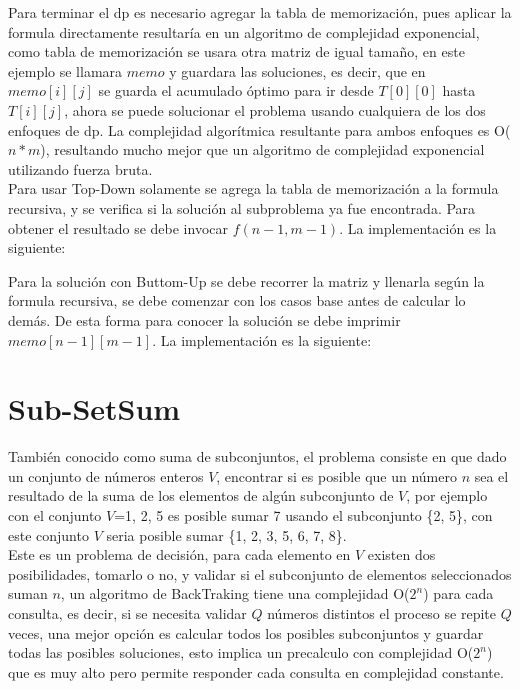 \documentclass[12pt, a4paper]{article}
\newcommand\cppfile[2][]{

}
\begin{document}
\begin{figure}[!htb]
			\caption{}
			\label{dp:introduccion:matriz3}
		\endminipage
	\end{figure}
	
	Para terminar el dp es necesario agregar la tabla de memorización, pues aplicar la formula directamente resultaría 
	en un algoritmo de complejidad exponencial, como tabla de memorización se usara otra matriz de igual tamaño, en  
	este ejemplo se llamara $memo$ y guardara las soluciones, es decir, que en $memo[i][j]$ se guarda el acumulado 
	óptimo para ir desde $T[0][0]$ hasta $T[i][j]$, ahora se puede solucionar el problema usando cualquiera de los dos 
	enfoques de dp. La complejidad algorítmica resultante para ambos enfoques es O($n*m$), resultando mucho mejor que 
	un algoritmo de complejidad exponencial utilizando fuerza bruta.\\
	
	Para usar Top-Down solamente se agrega la tabla de memorización a la formula recursiva, y se verifica si la 
	solución al subproblema ya fue encontrada. Para obtener el resultado se debe invocar $f(n-1, m-1)$. La 
	implementación es la siguiente:
	\cppfile[9-17]{Programacion_dinamica/codigos/matriz.cpp}
	
	Para la solución con Buttom-Up se debe recorrer la matriz y llenarla según la formula recursiva, se debe comenzar  
	con los casos base antes de calcular lo demás. De esta forma para conocer la solución se debe imprimir 
	$memo[n-1][m-1]$. La implementación es la siguiente:
	\cppfile[19-31]{Programacion_dinamica/codigos/matriz.cpp}
		
	\section{Sub-SetSum}
	\label{dp:sub_set_sum}
	
	También conocido como suma de subconjuntos, el problema consiste en que dado un conjunto de números enteros
	$V$, encontrar si es posible que un número $n$ sea el resultado de la suma de los elementos de algún
	subconjunto de $V$, por ejemplo con el conjunto $V$={1, 2, 5} es posible sumar 7 usando el subconjunto \{2, 5\},
	con este conjunto $V$ seria posible sumar \{1, 2, 3, 5, 6, 7, 8\}.\\
	
	Este es un problema de decisión, para cada elemento en $V$ existen dos posibilidades, tomarlo o no, y	validar 
	si el subconjunto de elementos seleccionados suman $n$, un algoritmo de BackTraking tiene una complejidad 
	O($2^{n}$) para cada consulta, es decir, si se necesita validar $Q$ números distintos el proceso se repite $Q$  
	veces, una mejor opción es calcular todos los posibles subconjuntos y guardar todas las posibles soluciones, esto
	implica un precalculo con complejidad O($2^{n}$) que es muy alto pero permite responder cada consulta en  
	complejidad constante.\\
	
\end{document}
